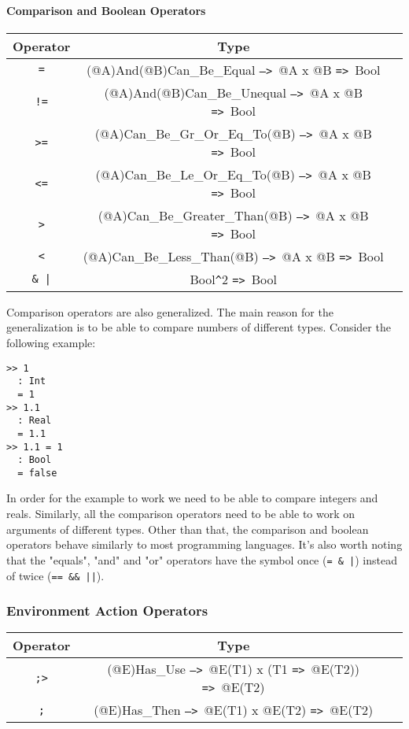 \documentclass{article}
\def\ra{\texttt{=>}\ }
\def\Ra{\texttt{-->}\ }
\begin{document}
\paragraph{Comparison and Boolean Operators}

\begin{center}
\begin{tabular}{ |c|c|c| } 
\hline
Operator & Type \\ 
\hline
\hline
\texttt{=} & (@A)And(@B)Can_Be_Equal \Ra @A x @B \ra Bool \\
\hline
\texttt{!=} & (@A)And(@B)Can_Be_Unequal \Ra @A x @B \ra Bool \\
\hline
\texttt{>=} & (@A)Can_Be_Gr_Or_Eq_To(@B) \Ra @A x @B \ra Bool \\
\hline
\texttt{<=} & (@A)Can_Be_Le_Or_Eq_To(@B) \Ra @A x @B \ra Bool \\
\hline
\texttt{>} & (@A)Can_Be_Greater_Than(@B) \Ra @A x @B \ra Bool \\
\hline
\texttt{<} & (@A)Can_Be_Less_Than(@B) \Ra @A x @B \ra Bool \\
\hline
\texttt{\& |} & Bool\texttt{\^}2 \ra Bool \\
\hline
\end{tabular}
\end{center}
Comparison operators are also generalized. The main reason for the
generalization is to be able to compare numbers of different types. Consider
the following example:

\begin{verbatim}
>> 1
  : Int
  = 1
>> 1.1
  : Real
  = 1.1
>> 1.1 = 1
  : Bool
  = false
\end{verbatim}
In order for the example to work we need to be able to compare integers and
reals.  Similarly, all the comparison operators need to be able to work on
arguments of different types. Other than that, the comparison and boolean
operators behave similarly to most programming languages. It's also worth
noting that the "equals", "and" and "or" operators have the symbol once
(\texttt{= \& |}) instead of twice (\texttt{== \&\& ||}).

\subsubsection{Environment Action Operators}
\label{subsec:envacts}

\begin{center}
\begin{tabular}{ |c|c|c| } 
\hline
Operator & Type \\ 
\hline
\hline
\texttt{;>} & (@E)Has_Use \Ra @E(T1) x (T1 \ra @E(T2)) \ra @E(T2) \\
\hline
\texttt{;} & (@E)Has_Then \Ra @E(T1) x @E(T2) \ra @E(T2) \\
\hline
\end{tabular}
\end{center}
\end{document}
